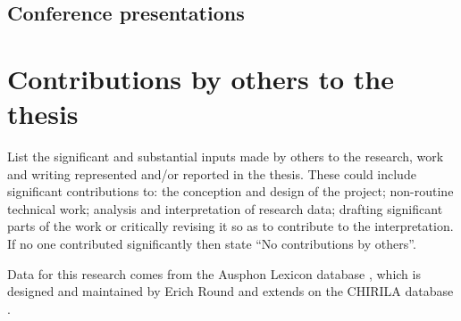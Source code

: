 
\nocite{round_automated_2020}
\printbibliography[keyword={post2016_publication},heading=none]

\subsection*{Conference presentations}

\nocite{macklin-cordes_historical_2019,
        round_clouded_2019,
        macklin-cordes_phylogeny_2018,
        macklin-cordes_robots_2017,
        macklin-cordes_fine-grained_2017,
        macklin-cordes_high-definition_2017,
        macklin-cordes_evaluating_2016,
        hollis_cape_2016,
        macklin-cordes_reflections_2016,
        round_grammar_2016,
        macklin-cordes_high-definition_2016,
        macklin-cordes_high-definition_2016-1}
\printbibliography[keyword={post2016_conference},heading=none]



\section*{Contributions by others to the thesis}

\begin{instructional}
	List the significant and substantial inputs made by others to the research, work and writing represented and/or reported in the thesis. These could include significant contributions to: the conception and design of the project; non-routine technical work; analysis and interpretation of research data; drafting significant parts of the work or critically revising it so as to contribute to the interpretation. \\
    
    \noindent
	If no one contributed significantly then state ``No contributions by others''.
\end{instructional}


\noindent
Data for this research comes from the Ausphon Lexicon database \autocite{round_ausphon-lexicon_2017}, which is designed and maintained by Erich Round and extends on the CHIRILA database \autocite{bowern_chirila_2016}.\\

